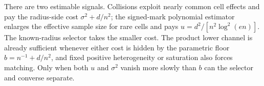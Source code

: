 There are two estimable signals.  Collisions exploit nearly common cell effects and pay the radius-side cost \(\sigma^2+d/n^2\); the signed-mark polynomial estimator enlarges the effective sample size for rare cells and pays \(u=d^2/[n^2\log^2(en)]\).  The known-radius selector takes the smaller cost.  The product lower channel is already sufficient whenever either cost is hidden by the parametric floor \(b=n^{-1}+d/n^2\), and fixed positive heterogeneity or saturation also forces matching.  Only when both \(u\) and \(\sigma^2\) vanish more slowly than \(b\) can the selector and converse separate.